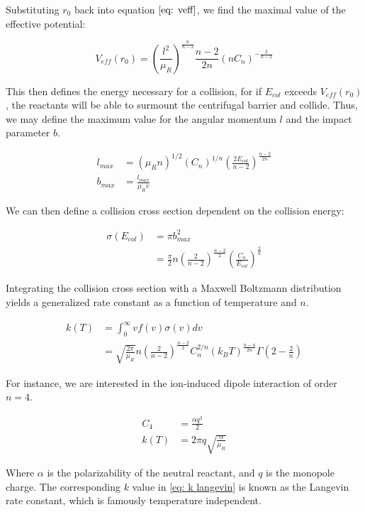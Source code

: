 Substituting $r_0$ back into equation $\ref{eq: veff}$, we find the maximal value of the effective potential:

\begin{equation}
    V_{eff}(r_0) = \left(\frac{l^2}{\mu_R}\right)^{\frac{n}{n-2}} \frac{n-2}{2n}(n C_n)^{-\frac{2}{n-2}}
\end{equation}

This then defines the energy necessary for a collision, for if $E_{col}$ exceeds $V_{eff}(r_0)$, the reactants will be able to surmount the centrifugal barrier and collide. Thus, we may define the maximum value for the angular momentum $l$ and the impact parameter $b$.

\begin{align*}
    l_{max} & = (\mu_R n)^{1/2}(C_n)^{1/n} \left(\frac{2 E_{col}}{n-2}\right)^{\frac{n-2}{2n}} \\
    b_{max} & = \frac{l_{max}}{\mu_R v}
\end{align*}

We can then define a collision cross section dependent on the collision energy:

\begin{align*}
    \sigma(E_{col}) & = \pi b^2_{max} \\
    & = \frac{\pi}{2} n \left(\frac{2}{n-2}\right)^{\frac{n-2}{2}} \left(\frac{C_n}{E_{col}}\right)^{\frac{2}{n}}
\end{align*}

Integrating the collision cross section with a Maxwell Boltzmann distribution yields a generalized rate constant as a function of temperature and $n$.

\begin{align}
    k(T) & = \int_0^{\infty} v f(v) \sigma(v) dv \label{eq: k int} \\
    & = \sqrt{\frac{2 \pi}{\mu_R}}n\left(\frac{2}{n-2}\right)^{\frac{n-2}{2}}C_n^{2/n}(k_B T)^{\frac{n-4}{2n}}\Gamma\left(2-\frac{2}{n}\right) \label{eq: k(T)}
\end{align}

For instance, we are interested in the ion-induced dipole interaction of order $n=4$.

\begin{align}
	C_4 & = \frac{\alpha q^2}{2} \nonumber \\
	k(T) & = 2\pi q \sqrt{\frac{\alpha}{\mu_R}} \label{eq: k langevin}
\end{align}

Where $\alpha$ is the polarizability of the neutral reactant, and $q$ is the monopole charge. The corresponding $k$ value in \cref{eq: k langevin} is known as the Langevin rate constant, which is famously temperature independent.

